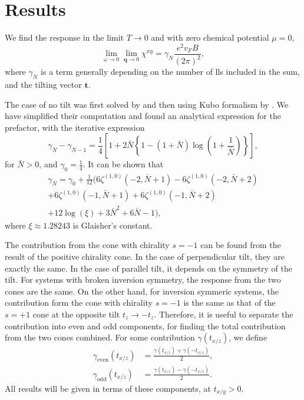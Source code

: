 \documentclass[%
 reprint,
 amsmath,amssymb,
 aps,
]{revtex4-2}
\renewcommand\vec\bm  %
\begin{document}
\section{Results\label{sec:results}}
We find the response in the limit \( T\to 0 \) and with zero chemical potential \( \mu = 0 \),
\begin{equation}
  \label{eq:response-w-dimensions}
  \lim_{\omega \to 0} \lim_{\vec{q} \to 0}
  \chi^{xy} =
  \gamma_{N} \frac{e^2 v_F B}{(2\pi)^2},
\end{equation}
where \( \gamma_N \) is a term generally depending on the number of \glspl{ll} included in the sum, and the tilting vector \( \vec{t} \).

The case of no tilt was first solved by \textcite{chernodubGenerationNernstCurrent2018} and then using Kubo formalism by \textcite{arjonaFingerprintsConformalAnomaly2019}.
We have simplified their computation and found an analytical expression for the prefactor, with the iterative expression
\begin{equation}
  \label{eq:2}
  \gamma_{\bar{N}} - \gamma_{\bar{N}-1} = \frac{1}{4} \left[ 1 + 2 \bar{N} \left\{ 1 - (1+\bar{N}) \log \left(1 + \frac{1}{\bar{N}}\right) \right\} \right],
\end{equation}
for \( \bar{N}>0 \), and \( \gamma_0 = \frac{1}{4} \).
It can be shown that
\begin{multline}
  \label{eq:4}
  \gamma_{\bar{N}} = \gamma_0 + \frac{1}{12} \Big(
    6 \zeta ^{(1,0)}(-2,\bar{N}+1)
    -6 \zeta ^{(1,0)}(-2,\bar{N}+2)\\
    +6 \zeta^{(1,0)}(-1,\bar{N}+1)
    + 6 \zeta^{(1,0)}(-1,\bar{N}+2)\\
    +12 \log (\xi)
    +3 \bar{N}^2
    +6 \bar{N}
    -1
  \Big),
\end{multline}
where \( \xi \approx  1.28243 \) is Glaisher's constant.


The contribution from the cone with chirality \( s = -1 \) can be found from the result of the positive chirality cone.
In the case of perpendicular tilt, they are exactly the same.
In the case of parallel tilt, it depends on the symmetry of the tilt.
For systems with broken inversion symmetry, the response from the two cones are the same.
On the other hand, for inversion symmeric systems, the contribution form the cone with chirality \( s=-1 \) is the same as that of the \( s=+1 \) cone at the opposite tilt \( t_z \to - t_z \).
Therefore, it is useful to separate the contribution into even and odd components, for finding the total contribution from the two cones combined.
For some contribution \( \gamma(t_{x /z}) \), we define
\begin{align}
  \gamma_{\text{even}}(t_{x/z}) &= \frac{\gamma(t_{x/z}) + \gamma(-t_{x/z})}{2}\label{eq:132},\\
  \gamma_{\text{odd}}(t_{x/z}) &= \frac{\gamma(t_{x/z}) - \gamma(-t_{x/z})}{2}\label{eq:133}.
\end{align}
All results will be given in terms of these components, at \( t_{x /y} > 0 \).
\end{document}
